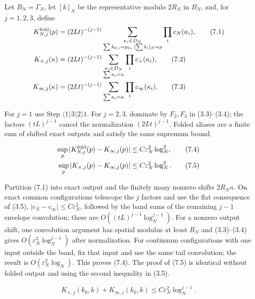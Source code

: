 \documentclass[11pt,a4paper]{article}
\newcommand{\eps}{\varepsilon}
\begin{document}
\QedStep


Let $B_N=\Gamma_N$, let $[k]_N$ be the representative modulo $2R_N$ in $B_N$, and,
for $j=1,2,3$, define
\begin{align*}
 K_{N,j}^{\rm fold}(p)&=(2Lt)^{-(j-1)}
 \sum_{\substack{\kappa_i\in D_N\\\sum k_{0,i}=p_0,\ [\sum k_i]_N=p}}
 \prod_i c_N(\kappa_i),\tag{7.1}\\
 K_{\times,j}(\kappa)&=(2Lt)^{-(j-1)}
 \sum_{\substack{\kappa_i\in D_N\\\sum\kappa_i=\kappa}}
 \prod_i c_\times(\kappa_i),\tag{7.2}\\
 K_{\infty,j}(\kappa)&=(2Lt)^{-(j-1)}
 \sum_{\sum\kappa_i=\kappa}\prod_i c_\infty(\kappa_i).\tag{7.3}
\end{align*}


\Because For $j=1$ use Step $\langle1\rangle3\langle2\rangle1$.  For
$j=2,3$, dominate by $F_2,F_3$ in (3.3)--(3.4); the factors
$(tL)^{j-1}$ cancel the normalization $(2Lt)^{j-1}$.  Folded aliases are a
finite sum of shifted exact outputs and satisfy the same supremum bound.

\begin{align*}
 \sup_p|K_{N,j}^{\rm fold}(p)-K_{\infty,j}(p)|&\le C\eps_N^2\log_N^2,
 \tag{7.4}\\
 \sup_p|K_{\times,j}(p)-K_{\infty,j}(p)|&\le C\eps_N^2\log_N^2.
 \tag{7.5}
\end{align*}

\Because Partition (7.1) into exact output and the finitely many nonzero shifts
$2R_Nn$.  On exact common configurations telescope the $j$ factors and use the flat
consequence of (3.5), $|c_N-c_\infty|\le C\eps_N^2$, followed by the band sums of
the remaining $j-1$ envelope convolution; these are $O((tL)^{j-1}\log_N^{j-1})$.
For a nonzero output shift, one convolution argument has spatial modulus at least
$R_N$ and (3.3)--(3.4) gives $O(\eps_N^2\log_N^{j-1})$ after normalization.
For continuum configurations with one input outside the band, fix that input and use
the same tail convolution; the result is $O(\eps_N^2\log_N)$.  This proves (7.4).
The proof of (7.5) is identical without folded output and using the second inequality
in (3.5).

\[
 K_{\times,j}(k_0,k)+K_{\infty,j}(k_0,k)
 \le C\eps_N^2\log_N^{j-1}.\tag{7.6}
\]
\end{document}
